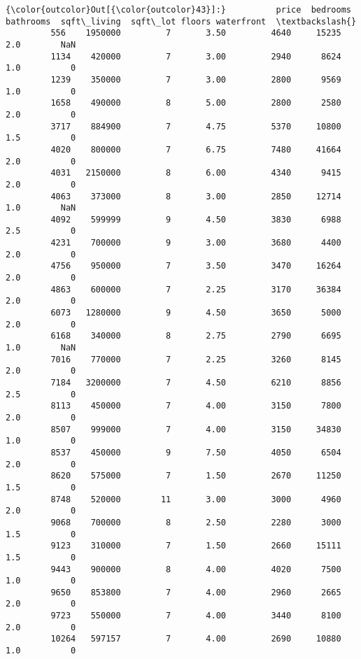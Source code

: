 \documentclass[11pt]{article}
\begin{document}
\begin{Verbatim}[commandchars=\\\{\}]
{\color{outcolor}Out[{\color{outcolor}43}]:}          price  bedrooms  bathrooms  sqft\_living  sqft\_lot floors waterfront  \textbackslash{}
         556    1950000         7       3.50         4640     15235    2.0        NaN   
         1134    420000         7       3.00         2940      8624    1.0          0   
         1239    350000         7       3.00         2800      9569    1.0          0   
         1658    490000         8       5.00         2800      2580    2.0          0   
         3717    884900         7       4.75         5370     10800    1.5          0   
         4020    800000         7       6.75         7480     41664    2.0          0   
         4031   2150000         8       6.00         4340      9415    2.0          0   
         4063    373000         8       3.00         2850     12714    1.0        NaN   
         4092    599999         9       4.50         3830      6988    2.5          0   
         4231    700000         9       3.00         3680      4400    2.0          0   
         4756    950000         7       3.50         3470     16264    2.0          0   
         4863    600000         7       2.25         3170     36384    2.0          0   
         6073   1280000         9       4.50         3650      5000    2.0          0   
         6168    340000         8       2.75         2790      6695    1.0        NaN   
         7016    770000         7       2.25         3260      8145    2.0          0   
         7184   3200000         7       4.50         6210      8856    2.5          0   
         8113    450000         7       4.00         3150      7800    2.0          0   
         8507    999000         7       4.00         3150     34830    1.0          0   
         8537    450000         9       7.50         4050      6504    2.0          0   
         8620    575000         7       1.50         2670     11250    1.5          0   
         8748    520000        11       3.00         3000      4960    2.0          0   
         9068    700000         8       2.50         2280      3000    1.5          0   
         9123    310000         7       1.50         2660     15111    1.5          0   
         9443    900000         8       4.00         4020      7500    1.0          0   
         9650    853800         7       4.00         2960      2665    2.0          0   
         9723    550000         7       4.00         3440      8100    2.0          0   
         10264   597157         7       4.00         2690     10880    1.0          0   

\end{Verbatim}
\end{document}

